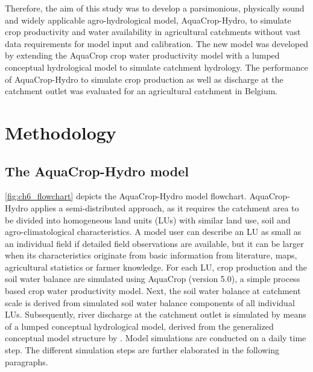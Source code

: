 Therefore, the aim of this study was to develop a parsimonious, physically sound and widely applicable agro-hydrological model, AquaCrop-Hydro, to simulate crop productivity and water availability in agricultural catchments without vast data requirements for model input and calibration. The new model was developed by extending the AquaCrop crop water productivity model \parencite{hsiao2009,steduto2009,raes2009a,vanuytrecht2014a} with a lumped conceptual hydrological model to simulate catchment hydrology. The performance of AquaCrop-Hydro to simulate crop production as well as discharge at the catchment outlet was evaluated for an agricultural catchment in Belgium. 

\section{Methodology} 
\subsection{The AquaCrop-Hydro model} \label{sec:ch6_ACHydro} 
\autoref{fig:ch6_flowchart} depicts the AquaCrop-Hydro model flowchart. AquaCrop-Hydro applies a semi-distributed approach, as it requires the catchment area to be divided into homogeneous land units (LUs) with similar land use, soil and agro-climatological characteristics. A model user can describe an LU as small as an individual field if detailed field observations are available, but it can be larger when its characteristics originate from basic information from literature, maps, agricultural statistics or farmer knowledge. For each LU, crop production and the soil water balance are simulated using AquaCrop (version 5.0), a simple process based crop water productivity model. Next, the soil water balance at catchment scale is derived from simulated soil water balance components of all individual LUs. Subsequently, river discharge at the catchment outlet is simulated by means of a lumped conceptual hydrological model, derived from the generalized conceptual model structure by \textcite{willems2014a}. Model simulations are conducted on a daily time step. The different simulation steps are further elaborated in the following paragraphs.

